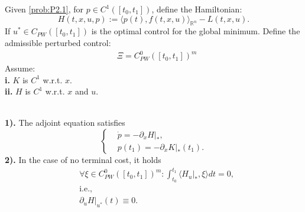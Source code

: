 \begin{theorem}
Given \eqref{prob:P2.1}, for $p \in C^1([t_0, t_1])$, define the Hamiltonian:
\begin{equation}
	H(t, x, u, p):= \langle p(t), f(t, x, u) \rangle_{\mathbb{R}^n} - L(t, x, u). 
\end{equation}
If $u^* \in C_{PW}([t_0, t_1])$ is the optimal control for the global minimum. Define the admissible perturbed control:
\begin{equation}
\begin{aligned}
	& \Xi = C_{PW}^0([t_0, t_1])^m
\end{aligned}
\end{equation}
Assume:\quad\\
\textbf{i.} $K$ is $C^1$ w.r.t. $x$. \quad\\
\textbf{ii.} $H$ is $C^1$ w.r.t. $x$ and $u$. 

\quad\\
\textbf{1).} The adjoint equation satisfies 
\begin{equation}
\left\{
\begin{aligned}
	& \dot{p} = - \partial_xH|_*,\\
	& p(t_1) = - \partial_x K|_* (t_1). 
\end{aligned}
\right.
\end{equation}
\textbf{2).} In the case of no terminal cost, it holds
\begin{equation*}
\begin{aligned}
	& \forall \xi \in C_{PW}^0([t_0, t_1])^m: \int_{t_0}^{t_1} \langle H_u|_*, \xi \rangle dt = 0, \\
	& \text{i.e., }\\
	& \partial_u H|_{u^*}(t) \equiv 0.
	\end{aligned}
\end{equation*}
\end{theorem}

